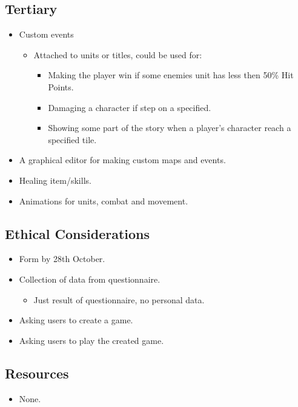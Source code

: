 \subsection{Tertiary} \label{tertiary}
\begin{itemize}
	\item Custom events
	\begin{itemize}
		\item Attached to units or titles, could be used for:
		\begin{itemize}
			\item Making the player win if some enemies unit has less then 50\% Hit Points.
			
			\item Damaging a character if step on a specified.
			
			\item Showing some part of the story when a player's character reach a specified tile.
		\end{itemize}
	\end{itemize}
	
	\item A graphical editor for making custom maps and events.
	
	\item Healing item\slash skills.
	
	\item Animations for units, combat and movement.
\end{itemize}

\subsection{Ethical Considerations} \label{ethicalconsiderations}
\begin{itemize}
	\item Form by 28th October.
	
	\item Collection of data from questionnaire.
	\begin{itemize}
		\item Just result of questionnaire, no personal data.
	\end{itemize}
	
	\item Asking users to create a game.
	
	\item Asking users to play the created game.
\end{itemize}

\subsection{Resources} \label{resources}
\begin{itemize}
	\item None.
\end{itemize}

% 

